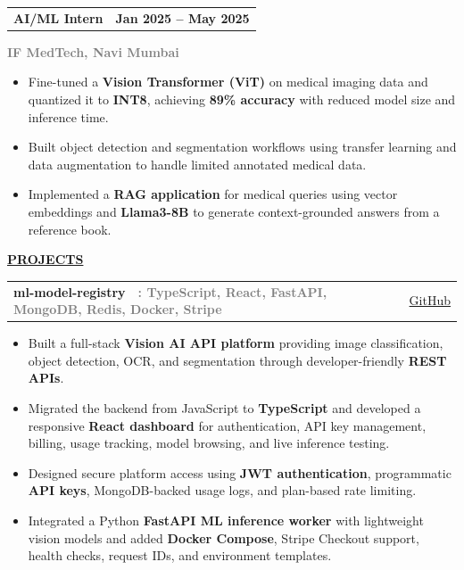 \documentclass[a4paper,11pt]{article}
\makeatletter
\newcommand{\TitleText}[1]{\textbf{\large #1}}
\newcommand{\BlackBold}[1]{\textbf{#1}}
\newcommand{\GrayText}[1]{\textcolor{graytext}{\textbf{#1}}}
\newcommand{\SectionHeader}[1]{%
  \vspace{2mm}%
  \begin{center}
    {\large\textbf{\underline{#1}}}%
  \end{center}
  \vspace{-2mm}%
}
\newcommand{\ProjectLine}[4]{%
  \begin{tabularx}{\textwidth}{@{} X r @{}}
    {\TitleText{#1}\ \ \GrayText{: #2}} & {\small \href{#4}{\textcolor{linkblue}{#3}}} \\
  \end{tabularx}
}
\makeatother
\begin{document}
\vspace{3mm}

\begin{tabularx}{\textwidth}{@{} X r @{}}
  {\TitleText{AI/ML Intern}} & {\large \textbf{Jan 2025 -- May 2025}} \\
\end{tabularx}
\GrayText{IF MedTech, Navi Mumbai}\\[-3mm]
{\normalsize
\begin{itemize}
  \item Fine-tuned a \BlackBold{Vision Transformer (ViT)} on medical imaging data and quantized it to \BlackBold{INT8}, achieving \BlackBold{89\% accuracy} with reduced model size and inference time.
  \item Built object detection and segmentation workflows using transfer learning and data augmentation to handle limited annotated medical data.
  \item Implemented a \BlackBold{RAG application} for medical queries using vector embeddings and \BlackBold{Llama3-8B} to generate context-grounded answers from a reference book.
\end{itemize}
}

\SectionHeader{PROJECTS}

\ProjectLine{ml-model-registry}{TypeScript, React, FastAPI, MongoDB, Redis, Docker, Stripe}{GitHub}{https://github.com/Makireddyvighnesh/ml-model-registry}
{\normalsize
\begin{itemize}
  \item Built a full-stack \BlackBold{Vision AI API platform} providing image classification, object detection, OCR, and segmentation through developer-friendly \BlackBold{REST APIs}.
  \item Migrated the backend from JavaScript to \BlackBold{TypeScript} and developed a responsive \BlackBold{React dashboard} for authentication, API key management, billing, usage tracking, model browsing, and live inference testing.
  \item Designed secure platform access using \BlackBold{JWT authentication}, programmatic \BlackBold{API keys}, MongoDB-backed usage logs, and plan-based rate limiting.
  \item Integrated a Python \BlackBold{FastAPI ML inference worker} with lightweight vision models and added \BlackBold{Docker Compose}, Stripe Checkout support, health checks, request IDs, and environment templates.
\end{itemize}
}
\end{document}
